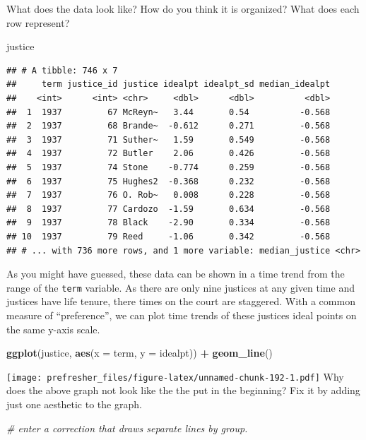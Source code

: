 \documentclass[]{book}
\newenvironment{Shaded}{\begin{snugshade}}{\end{snugshade}}
\newcommand{\CommentTok}[1]{\textcolor[rgb]{0.56,0.35,0.01}{\textit{#1}}}
\newcommand{\DataTypeTok}[1]{\textcolor[rgb]{0.13,0.29,0.53}{#1}}
\newcommand{\KeywordTok}[1]{\textcolor[rgb]{0.13,0.29,0.53}{\textbf{#1}}}
\newcommand{\NormalTok}[1]{#1}
\newcommand{\OperatorTok}[1]{\textcolor[rgb]{0.81,0.36,0.00}{\textbf{#1}}}
\newcommand{\StringTok}[1]{\textcolor[rgb]{0.31,0.60,0.02}{#1}}
\theoremstyle{definition}
\theoremstyle{definition}
\theoremstyle{definition}
\theoremstyle{remark}
\begin{document}
What does the data look like? How do you think it is organized? What does each row represent?

\begin{Shaded}
\begin{Highlighting}[]
\NormalTok{justice}
\end{Highlighting}
\end{Shaded}

\begin{verbatim}
## # A tibble: 746 x 7
##     term justice_id justice idealpt idealpt_sd median_idealpt
##    <int>      <int> <chr>     <dbl>      <dbl>          <dbl>
##  1  1937         67 McReyn~   3.44       0.54          -0.568
##  2  1937         68 Brande~  -0.612      0.271         -0.568
##  3  1937         71 Suther~   1.59       0.549         -0.568
##  4  1937         72 Butler    2.06       0.426         -0.568
##  5  1937         74 Stone    -0.774      0.259         -0.568
##  6  1937         75 Hughes2  -0.368      0.232         -0.568
##  7  1937         76 O. Rob~   0.008      0.228         -0.568
##  8  1937         77 Cardozo  -1.59       0.634         -0.568
##  9  1937         78 Black    -2.90       0.334         -0.568
## 10  1937         79 Reed     -1.06       0.342         -0.568
## # ... with 736 more rows, and 1 more variable: median_justice <chr>
\end{verbatim}

As you might have guessed, these data can be shown in a time trend from the range of the \texttt{term} variable. As there are only nine justices at any given time and justices have life tenure, there times on the court are staggered. With a common measure of ``preference'', we can plot time trends of these justices ideal points on the same y-axis scale.

\begin{Shaded}
\begin{Highlighting}[]
\KeywordTok{ggplot}\NormalTok{(justice, }\KeywordTok{aes}\NormalTok{(}\DataTypeTok{x =}\NormalTok{ term, }\DataTypeTok{y =}\NormalTok{ idealpt)) }\OperatorTok{+}
\StringTok{  }\KeywordTok{geom_line}\NormalTok{()}
\end{Highlighting}
\end{Shaded}

\texttt{[image: prefresher\_files/figure-latex/unnamed-chunk-192-1.pdf]}
Why does the above graph not look like the the put in the beginning? Fix it by adding just one aesthetic to the graph.

\begin{Shaded}
\begin{Highlighting}[]
\CommentTok{# enter a correction that draws separate lines by group.}
\end{Highlighting}
\end{Shaded}
\end{document}
